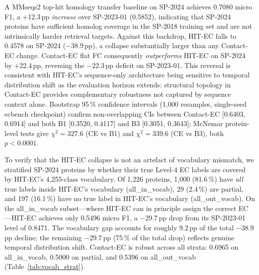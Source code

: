 \documentclass[namedate,contemporary,mediumone]{oup-authoring-template}
\begin{document}
A MMseqs2 top-hit homology transfer baseline on SP-2024 achieves 0.7080
micro F1, a $+$12.3\,pp \emph{increase} over SP-2023-01 (0.5852), indicating
that SP-2024 proteins have sufficient homolog coverage in the SP-2018 training
set and are not intrinsically harder retrieval targets. Against this backdrop,
HIT-EC falls to 0.4578 on SP-2024 ($-$38.9\,pp), a collapse
substantially larger than any Contact-EC change. Contact-EC flat FC consequently
\emph{outperforms} HIT-EC on SP-2024 by $+$22.4\,pp, reversing the $-$22.3\,pp
deficit on SP-2023-01. This reversal is consistent with HIT-EC's sequence-only
architecture being sensitive to temporal distribution shift as the evaluation
horizon extends: structural topology in Contact-EC provides complementary
robustness not captured by sequence context alone. Bootstrap 95\,\% confidence
intervals (1{,}000 resamples, single-seed ecbench checkpoint) confirm
non-overlapping CIs between Contact-EC [0.6403, 0.6914] and both B1 [0.3520,
0.4117] and B3 [0.3051, 0.3643]; McNemar protein-level tests give
$\chi^2\!=\!327.6$ (CE vs B1) and $\chi^2\!=\!339.6$ (CE vs B3), both $p<0.0001$.

To verify that the HIT-EC collapse is not an artefact of vocabulary
mismatch, we stratified SP-2024 proteins by whether their true Level-4
EC labels are covered by HIT-EC's 4{,}255-class vocabulary. Of 1{,}226
proteins, 1{,}000 (81.6\,\%) have \emph{all} true labels inside HIT-EC's
vocabulary (all\_in\_vocab), 29 (2.4\,\%) are partial, and 197 (16.1\,\%)
have no true label in HIT-EC's vocabulary (all\_out\_vocab).
On the all\_in\_vocab subset---where HIT-EC can in principle assign the
correct EC---HIT-EC achieves only 0.5496 micro F1, a $-$29.7\,pp drop
from its SP-2023-01 level of 0.8471. The vocabulary gap accounts for
roughly 9.2\,pp of the total $-$38.9\,pp decline; the remaining
$-$29.7\,pp (75\,\% of the total drop) reflects genuine temporal
distribution shift. Contact-EC is robust across all strata: 0.6965 on
all\_in\_vocab, 0.5000 on partial, and 0.5396 on all\_out\_vocab (Table~\ref{tab:vocab_strat}).
\end{document}
